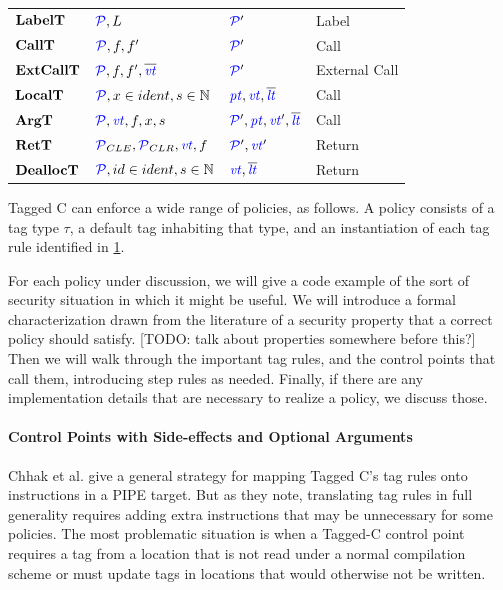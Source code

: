 \documentclass[acmsmall,review,anonymous]{acmart}\settopmatter{printfolios=true,printccs=false,printacmref=false}
\begin{document}
\begin{table}
\begin{tabular}{|l|l|l|l|}
    \(\mathbf{LabelT}\)     & \(\mathcal{\color{blue} P}, L\)        & \(\mathcal{\color{blue} P}'\)     & Label \\
    \(\mathbf{CallT}\)      & \(\mathcal{\color{blue} P}, f, f'\)         & \(\mathcal{\color{blue} P}'\)      & Call \\
    \(\mathbf{ExtCallT}\)   & \(\mathcal{\color{blue} P}, f, f', \overline{\mathit{\color{blue} vt}}\)      & \(\mathcal{\color{blue} P}'\)   & External Call \\
    \(\mathbf{LocalT}\)     & \(\mathcal{\color{blue} P}, x \in ident, s \in \mathbb{N}\)   & \(\mathit{\color{blue} pt},\mathit{\color{blue} vt},\overline{\mathit{\color{blue} lt}}\)     & Call \\
    \(\mathbf{ArgT}\)       & \(\mathcal{\color{blue} P}, \mathit{\color{blue} vt}, f, x, s\)          & \(\mathcal{\color{blue} P}', \mathit{\color{blue} pt}, \mathit{\color{blue} vt}',\overline{\color{blue} \mathit{\color{blue} lt}}\)       & Call \\
    \(\mathbf{RetT}\)       & \(\mathcal{\color{blue} P}_{CLE}, \mathcal{\color{blue} P}_{CLR}, \mathit{\color{blue} vt}, f\)          & \(\mathcal{\color{blue} P}',\mathit{\color{blue} vt}'\)       & Return \\
    \(\mathbf{DeallocT}\)   & \(\mathcal{\color{blue} P}, id \in ident, s \in \mathbb{N}\) & \(\mathit{\color{blue} vt},\overline{\mathit{\color{blue} lt}}\)   & Return \\
    \hline
  \end{tabular}

  \label{fig:controlpoints}
\end{table}

Tagged C can enforce a wide range of policies, as follows.
A policy consists of a tag type \(\tau\), a default tag inhabiting that type, and an instantiation
of each tag rule identified in \cref{fig:controlpoints}.

For each policy under discussion, we will give a code example of the sort of security
situation in which it might be useful. We will introduce a formal characterization drawn
from the literature of a security property that a correct policy should satisfy.
[TODO: talk about properties somewhere before this?]
Then we will walk through the important tag rules, and the control points that call them,
introducing step rules as needed. Finally, if there are any implementation details that
are necessary to realize a policy, we discuss those.

\paragraph*{Control Points with Side-effects and Optional Arguments}

Chhak et al. \cite{Chhak21:Tagine} give a general strategy for mapping Tagged C's tag rules
onto instructions in a PIPE target. But as they note, translating tag rules in full generality
requires adding extra instructions that may be unnecessary for some policies. The most problematic
situation is when a Tagged-C control point requires a tag from a location that is not read under
a normal compilation scheme or must update tags in locations that would otherwise not be written.
\end{document}
